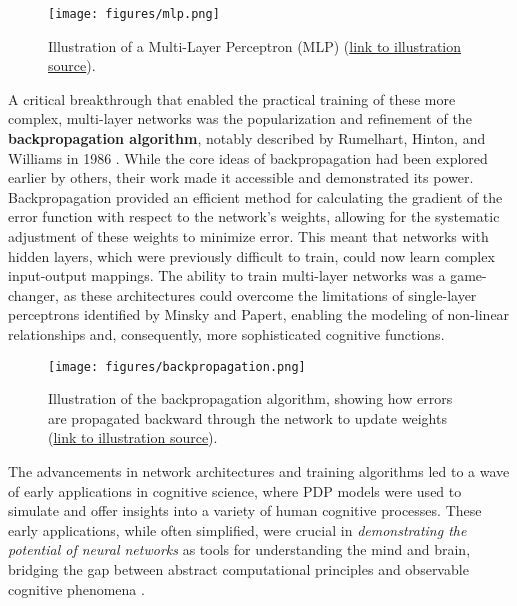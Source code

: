 \begin{figure}[H]
    \centering
    \texttt{[image: figures/mlp.png]}
    \caption{Illustration of a Multi-Layer Perceptron (MLP) (\href{https://www.turing.com/kb/explanation-of-deep-neural-network-multilayer-perceptron-deep-q-network}{link to illustration source}).}
    \label{fig:pdp-model}
\end{figure}

A critical breakthrough that enabled the practical training of these more complex, multi-layer networks was the popularization and refinement of the \textbf{backpropagation algorithm}, notably described by Rumelhart, Hinton, and Williams in 1986 \cite{rumelhart1986learning}. While the core ideas of backpropagation had been explored earlier by others, their work made it accessible and demonstrated its power. Backpropagation provided an efficient method for calculating the gradient of the error function with respect to the network's weights, allowing for the systematic adjustment of these weights to minimize error. This meant that networks with hidden layers, which were previously difficult to train, could now learn complex input-output mappings. The ability to train multi-layer networks was a game-changer, as these architectures could overcome the limitations of single-layer perceptrons identified by Minsky and Papert, enabling the modeling of non-linear relationships and, consequently, more sophisticated cognitive functions.

\begin{figure}[H]
    \centering
    \texttt{[image: figures/backpropagation.png]}
    \caption{Illustration of the backpropagation algorithm, showing how errors are propagated backward through the network to update weights (\href{https://medium.com/@lmpo/backpropagation-the-backbone-of-neural-network-training-64946d6c3ae5}{link to illustration source}).}
    \label{fig:backpropagation}
\end{figure}

The advancements in network architectures and training algorithms led to a wave of early applications in cognitive science, where PDP models were used to simulate and offer insights into a variety of human cognitive processes. These early applications, while often simplified, were crucial in \textit{demonstrating the potential of neural networks} as tools for understanding the mind and brain, bridging the gap between abstract computational principles and observable cognitive phenomena \cite{mcclelland1986parallel}.

